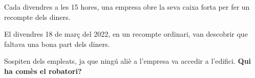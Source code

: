 \documentclass[a4paper,12pt]{article}
\begin{document}

Cada divendres a les 15 hores, una empresa obre la seva caixa forta per fer un recompte dels diners.

El divendres 18 de març del 2022, en un recompte ordinari, van descobrir que faltava una bona part dels diners.

Sospiten dels empleats, ja que ningú aliè a l'empresa va accedir a l'edifici. \textbf{Qui ha comès el robatori?}
\end{document}
